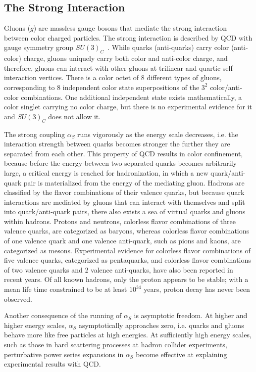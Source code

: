 \subsection{The Strong Interaction}
Gluons ($g$) are massless gauge bosons that mediate the strong interaction between color charged particles.
The strong interaction is described by QCD with gauge symmetry group $SU(3)_C$~\cite{nagashima_2013_V1}.
While quarks (anti-quarks) carry color (anti-color) charge, gluons uniquely carry both color and anti-color charge, and therefore, gluons can interact with other gluons at trilinear and quartic self-interaction vertices.
There is a color octet of 8 different types of gluons, corresponding to 8 independent color state superpositions of the $3^2$ color/anti-color combinations.
One additional independent state exists mathematically, a color singlet carrying no color charge, but there is no experimental evidence for it and $SU(3)_C$ does not allow it.

The strong coupling $\alpha_S$ runs vigorously as the energy scale decreases, i.e. the interaction strength between quarks becomes stronger the further they are separated from each other.
This property of QCD results in color confinement, because before the energy between two separated quarks becomes arbitrarily large, a critical energy is reached for hadronization, in which a new quark/anti-quark pair is materialized from the energy of the mediating gluon.
Hadrons are classified by the flavor combinations of their valence quarks, but because quark interactions are mediated by gluons that can interact with themselves and split into quark/anti-quark pairs, there also exists a sea of virtual quarks and gluons within hadrons.
Protons and neutrons, colorless flavor combinations of three valence quarks, are categorized as baryons, whereas colorless flavor combinations of one valence quark and one valence anti-quark, such as pions and kaons, are categorized as mesons.
Experimental evidence for colorless flavor combinations of five valence quarks, categorized as pentaquarks, and colorless flavor combinations of two valence quarks and 2 valence anti-quarks, have also been reported in recent years.
Of all known hadrons, only the proton appears to be stable; with a mean life time constrained to be at least $10^34$ years, proton decay has never been observed.

Another consequence of the running of $\alpha_S$ is asymptotic freedom.
At higher and higher energy scales, $\alpha_S$ asymptotically approaches zero, i.e. quarks and gluons behave more like free particles at high energies.
At sufficiently high energy scales, such as those in hard scattering processes at hadron collider experiments, perturbative power series expansions in $\alpha_S$ become effective at explaining experimental results with QCD.


